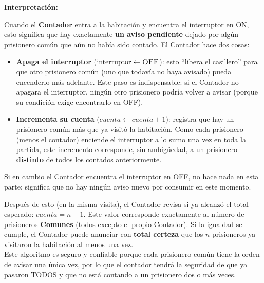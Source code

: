 \textbf{Interpretación:}

Cuando el \textbf{Contador} entra a la habitación y encuentra el interruptor en \textsc{ON}, esto significa que hay exactamente \textbf{un aviso pendiente} dejado por algún prisionero común que aún no había sido contado. El Contador hace dos cosas:

\begin{itemize}
    \item \textbf{Apaga el interruptor} ($\text{interruptor} \leftarrow \textsc{OFF}$): esto ``libera el casillero'' para que otro prisionero común (uno que todavía no haya avisado) pueda encenderlo más adelante. Este paso es indispensable: si el Contador no apagara el interruptor, ningún otro prisionero podría volver a avisar (porque su condición exige encontrarlo en \textsc{OFF}).
    \item \textbf{Incrementa su cuenta} ($\textit{cuenta} \leftarrow \textit{cuenta} + 1$): registra que hay un prisionero común más que ya visitó la habitación. Como cada prisionero (menos el contador) enciende el interruptor a lo sumo una vez en toda la partida, este incremento corresponde, sin ambigüedad, a un prisionero \textbf{distinto} de todos los contados anteriormente.
\end{itemize}

Si en cambio el Contador encuentra el interruptor en \textsc{OFF}, no hace nada en esta parte: significa que no hay ningún aviso nuevo por consumir en este momento.

Después de esto (en la misma visita), el Contador revisa si ya alcanzó el total esperado: $\textit{cuenta} = n - 1$. Este valor corresponde exactamente al número de prisioneros \textbf{Comunes} (todos excepto el propio Contador). Si la igualdad se cumple, el Contador puede anunciar con \textbf{total certeza} que los $n$ prisioneros ya visitaron la habitación al menos una vez.\\

Este algoritmo es seguro y confiable porque cada prisionero común tiene la orden de avisar una única vez, por lo que el contador tendrá la seguridad de que ya pasaron TODOS y que no está contando a un prisionero dos o más veces. 

    